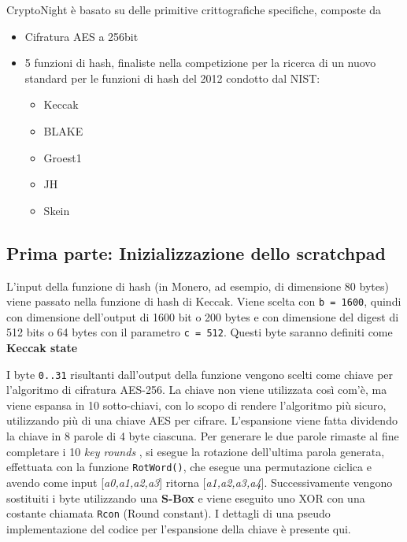 CryptoNight è basato su delle primitive crittografiche specifiche,
composte da 
\begin{itemize}
  \item
  Cifratura AES a 256bit
  \item 5 funzioni di hash, finaliste
  nella competizione per la ricerca di un nuovo standard per le funzioni
  di hash del 2012 condotto dal NIST:
  \begin{itemize}
    \item Keccak
    \item BLAKE
    \item Groest1
    \item JH
    \item Skein
  \end{itemize}
\end{itemize}

\subsection{Prima parte: Inizializzazione dello
scratchpad}\label{prima-parte-inizializzazione-dello-scratchpad}

L'input della funzione di hash (in Monero, ad esempio, di dimensione 80
bytes) viene passato nella funzione di hash di Keccak\cite{bertoni2011keccak}. Viene scelta con
\texttt{b\ =\ 1600}, quindi con dimensione dell'output di 1600 bit o 200
bytes e con dimensione del digest di 512 bits o 64 bytes con il
parametro \texttt{c\ =\ 512}. Questi byte saranno definiti come
\textbf{Keccak state} \cite{keccak_parameters}

I byte \texttt{0..31} risultanti dall'output della funzione vengono
scelti come chiave per l'algoritmo di cifratura AES-256. La chiave non
viene utilizzata così com'è, ma viene espansa\cite{standard2001federal} in 10 sotto-chiavi, con lo
scopo di rendere l'algoritmo più sicuro, utilizzando più di una chiave
AES per cifrare. L'espansione viene fatta dividendo la chiave in 8
parole di 4 byte ciascuna. Per generare le due parole rimaste al fine
completare i 10 \emph{key rounds} , si esegue la rotazione
dell'ultima parola generata, effettuata con la funzione
\texttt{RotWord()}, che esegue una permutazione ciclica e avendo come
input {[}\emph{a0,a1,a2,a3}{]} ritorna {[}\emph{a1,a2,a3,a4}{]}.
Successivamente vengono sostituiti i byte utilizzando una \textbf{S-Box}
e viene eseguito uno XOR con una costante chiamata \texttt{Rcon} (Round
constant). I dettagli di una pseudo implementazione del codice per
l'espansione della chiave è presente qui.

